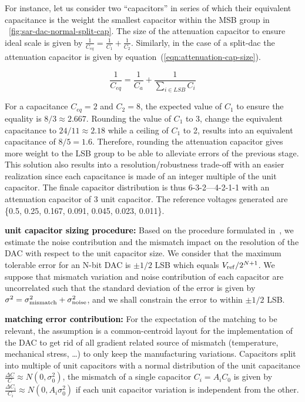 For instance, let us consider two ``capacitors'' in series of which their equivalent capacitance is the weight the smallest capacitor within the MSB group in \figurename~\ref{fig:sar-dac-normal-split-cap}. The size of the attenuation capacitor to ensure ideal scale is given by \(\frac{1}{C_{eq}} = \frac{1}{C_1}+\frac{1}{C_2}\). Similarly, in the case of a split-dac the attenuation capacitor is given by equation~(\ref{eqn:attenuation-cap-size}).

\begin{equation}
\label{eqn:attenuation-cap-size}
\frac{1}{C_{eq}} = \frac{1}{C_a}+\frac{1}{\sum_{i \in LSB}{C_i}}
\end{equation}

For a capacitance \(C_{eq} = 2 \) and \(C_2 = 8\), the expected value of \(C_1\) to ensure the equality is \(8/3 \approx 2.667 \). Rounding the value of \(C_1\) to 3, change the equivalent capacitance to \(24/11 \approx 2.18 \) while a ceiling of \(C_1\) to 2, results into an equivalent capacitance of \(8/5 = 1.6 \). Therefore, rounding the attenuation capacitor gives more weight to the LSB group to be able to alleviate errors of the previous stage. This solution also results into a resolution/robustness trade-off with an easier realization since each capacitance is made of an integer multiple of the unit capacitor. The finale capacitor distribution is thus 6-3-2---4-2-1-1 with an attenuation capacitor of 3 unit capacitor. The reference voltages generated are \{0.5, 0.25, 0.167, 0.091, 0.045, 0.023, 0.011\}.

\textbf{\textcolor{black}{unit capacitor sizing procedure:}}
Based on the procedure formulated in~\cite{Yue2013}, we estimate the noise contribution and the mismatch impact on the resolution of the DAC with respect to the unit capacitor size. We consider that the maximum tolerable error for an N-bit DAC is $\pm 1/2$ LSB which equals $V_{\rm ref}/2^{N+1}$. We suppose that mismatch variation and noise contribution of each capacitor are uncorrelated such that the standard deviation of the error is given by $\sigma^2 = \sigma_{\rm mismatch}^2 + \sigma_{\rm noise}^2$, and we shall constrain the error to within $\pm 1/2$ LSB.

\textbf{\textcolor{black}{matching error contribution:}}
For the expectation of the matching to be relevant, the assumption is a common-centroid layout for the implementation of the DAC to get rid of all gradient related source of mismatch (temperature, mechanical stress, \ldots) to only keep the manufacturing variations. Capacitors split into multiple of unit capacitors with a normal distribution of the unit capacitance $\frac{\Delta C}{C} \approx N(0, \sigma_0^2)$, the mismatch of a single capacitor \(C_i = A_iC_0\) is given by $\frac{\Delta C_i}{C_i} \approx N(0, A_i\sigma_0^2)$ if each unit capacitor variation is independent from the other.

